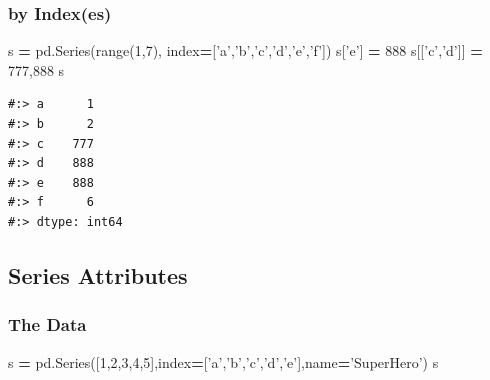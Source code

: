 \documentclass[
]{book}
\newenvironment{Shaded}{\begin{snugshade}}{\end{snugshade}}
\newcommand{\BuiltInTok}[1]{#1}
\newcommand{\DecValTok}[1]{\textcolor[rgb]{0.06,0.06,0.06}{#1}}
\newcommand{\NormalTok}[1]{#1}
\newcommand{\OperatorTok}[1]{\textcolor[rgb]{0.43,0.43,0.43}{\textbf{#1}}}
\newcommand{\StringTok}[1]{\textcolor[rgb]{0.5,0.5,0.5}{#1}}
\begin{document}
\hypertarget{by-indexes-1}{%
\subsubsection{by Index(es)}\label{by-indexes-1}}

\begin{Shaded}
\begin{Highlighting}[]
\NormalTok{s }\OperatorTok{=}\NormalTok{ pd.Series(}\BuiltInTok{range}\NormalTok{(}\DecValTok{1}\NormalTok{,}\DecValTok{7}\NormalTok{), index}\OperatorTok{=}\NormalTok{[}\StringTok{'a'}\NormalTok{,}\StringTok{'b'}\NormalTok{,}\StringTok{'c'}\NormalTok{,}\StringTok{'d'}\NormalTok{,}\StringTok{'e'}\NormalTok{,}\StringTok{'f'}\NormalTok{])}
\NormalTok{s[}\StringTok{'e'}\NormalTok{] }\OperatorTok{=} \DecValTok{888}
\NormalTok{s[[}\StringTok{'c'}\NormalTok{,}\StringTok{'d'}\NormalTok{]] }\OperatorTok{=} \DecValTok{777}\NormalTok{,}\DecValTok{888}
\NormalTok{s}
\end{Highlighting}
\end{Shaded}

\begin{verbatim}
#:> a      1
#:> b      2
#:> c    777
#:> d    888
#:> e    888
#:> f      6
#:> dtype: int64
\end{verbatim}

\hypertarget{series-attributes}{%
\subsection{Series Attributes}\label{series-attributes}}

\hypertarget{the-data}{%
\subsubsection{The Data}\label{the-data}}

\begin{Shaded}
\begin{Highlighting}[]
\NormalTok{s }\OperatorTok{=}\NormalTok{ pd.Series([}\DecValTok{1}\NormalTok{,}\DecValTok{2}\NormalTok{,}\DecValTok{3}\NormalTok{,}\DecValTok{4}\NormalTok{,}\DecValTok{5}\NormalTok{],index}\OperatorTok{=}\NormalTok{[}\StringTok{'a'}\NormalTok{,}\StringTok{'b'}\NormalTok{,}\StringTok{'c'}\NormalTok{,}\StringTok{'d'}\NormalTok{,}\StringTok{'e'}\NormalTok{],name}\OperatorTok{=}\StringTok{'SuperHero'}\NormalTok{) }
\NormalTok{s}
\end{Highlighting}
\end{Shaded}
\end{document}
